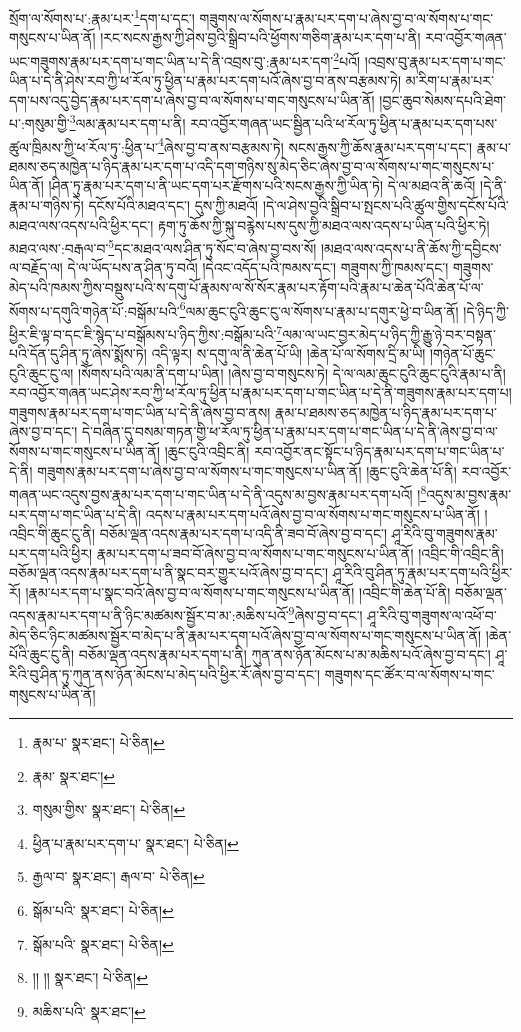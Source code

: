 སྲོག་ལ་སོགས་པ་:རྣམ་པར་\footnote{རྣམ་པ་  སྣར་ཐང་།  པེ་ཅིན། }དག་པ་དང་། གཟུགས་ལ་སོགས་པ་རྣམ་པར་དག་པ་ཞེས་བྱ་བ་ལ་སོགས་པ་གང་གསུངས་པ་ཡིན་ནོ། །རང་སངས་རྒྱས་ཀྱི་ཤེས་བྱའི་སྒྲིབ་པའི་ཕྱོགས་གཅིག་རྣམ་པར་དག་པ་ནི། རབ་འབྱོར་གཞན་ཡང་གཟུགས་རྣམ་པར་དག་པ་གང་ཡིན་པ་དེ་ནི་འབྲས་བུ་:རྣམ་པར་དག་\footnote{རྣམ་  སྣར་ཐང་། }པའོ། །འབྲས་བུ་རྣམ་པར་དག་པ་གང་ཡིན་པ་དེ་ནི་ཤེས་རབ་ཀྱི་ཕ་རོལ་ཏུ་ཕྱིན་པ་རྣམ་པར་དག་པའོ་ཞེས་བྱ་བ་ནས་བརྩམས་ཏེ། མ་རིག་པ་རྣམ་པར་དག་པས་འདུ་བྱེད་རྣམ་པར་དག་པ་ཞེས་བྱ་བ་ལ་སོགས་པ་གང་གསུངས་པ་ཡིན་ནོ། །བྱང་ཆུབ་སེམས་དཔའི་ཐེག་པ་:གསུམ་གྱི་\footnote{གསུམ་གྱིས་  སྣར་ཐང་།  པེ་ཅིན། }ལམ་རྣམ་པར་དག་པ་ནི། རབ་འབྱོར་གཞན་ཡང་སྦྱིན་པའི་ཕ་རོལ་ཏུ་ཕྱིན་པ་རྣམ་པར་དག་པས་ཚུལ་ཁྲིམས་ཀྱི་ཕ་རོལ་ཏུ་:ཕྱིན་པ་\footnote{ཕྱིན་པ་རྣམ་པར་དག་པ་  སྣར་ཐང་།  པེ་ཅིན། }ཞེས་བྱ་བ་ནས་བརྩམས་ཏེ། སངས་རྒྱས་ཀྱི་ཆོས་རྣམ་པར་དག་པ་དང་། རྣམ་པ་ཐམས་ཅད་མཁྱེན་པ་ཉིད་རྣམ་པར་དག་པ་འདི་དག་གཉིས་སུ་མེད་ཅིང་ཞེས་བྱ་བ་ལ་སོགས་པ་གང་གསུངས་པ་ཡིན་ནོ། །ཤིན་ཏུ་རྣམ་པར་དག་པ་ནི་ཡང་དག་པར་རྫོགས་པའི་སངས་རྒྱས་ཀྱི་ཡིན་ཏེ། དེ་ལ་མཐའ་ནི་ཆའོ། །དེ་ནི་རྣམ་པ་གཉིས་ཏེ། དངོས་པོའི་མཐའ་དང་། དུས་ཀྱི་མཐའོ། །དེ་ལ་ཤེས་བྱའི་སྒྲིབ་པ་སྤངས་པའི་ཚུལ་གྱིས་དངོས་པོའི་མཐའ་ལས་འདས་པའི་ཕྱིར་དང་། རྟག་ཏུ་ཆོས་ཀྱི་སྐུ་བརྙེས་པས་དུས་ཀྱི་མཐའ་ལས་འདས་པ་ཡིན་པའི་ཕྱིར་ཏེ། མཐའ་ལས་:བརྒལ་བ་\footnote{རྒྱལ་བ་  སྣར་ཐང་། རྒལ་བ་  པེ་ཅིན། }དང་མཐའ་ལས་ཤིན་ཏུ་སོང་བ་ཞེས་བྱ་བས་སོ། །མཐའ་ལས་འདས་པ་ནི་ཆོས་ཀྱི་དབྱིངས་ལ་བརྗོད་ལ། དེ་ལ་ཡོད་པས་ན་ཤིན་ཏུ་བའོ། །དེའང་འདོད་པའི་ཁམས་དང་། གཟུགས་ཀྱི་ཁམས་དང་། གཟུགས་མེད་པའི་ཁམས་ཀྱིས་བསྡུས་པའི་ས་དགུ་པོ་རྣམས་ལ་སོ་སོར་རྣམ་པར་རྟོག་པའི་རྣམ་པ་ཆེན་པོའི་ཆེན་པོ་ལ་སོགས་པ་དགུའི་གཉེན་པོ་:བསྒོམ་པའི་\footnote{སྒོམ་པའི་  སྣར་ཐང་།  པེ་ཅིན། }ལམ་ཆུང་ངུའི་ཆུང་ངུ་ལ་སོགས་པ་རྣམ་པ་དགུར་ཕྱེ་བ་ཡིན་ནོ། །དེ་ཉིད་ཀྱི་ཕྱིར་ཇི་ལྟ་བ་དང་ཇི་སྙེད་པ་བསྒོམས་པ་ཉིད་ཀྱིས་:བསྒོམ་པའི་\footnote{སྒོམ་པའི་  སྣར་ཐང་།  པེ་ཅིན། }ལམ་ལ་ཡང་བྱར་མེད་པ་ཉིད་ཀྱི་རྒྱུ་ཉེ་བར་བསྟན་པའི་དོན་དུ་ཤིན་ཏུ་ཞེས་སྨོས་ཏེ། འདི་ལྟར། ས་དགུ་ལ་ནི་ཆེན་པོ་ཡི། །ཆེན་པོ་ལ་སོགས་དྲི་མ་ཡི། །གཉེན་པོ་ཆུང་ངུའི་ཆུང་ངུ་ལ། །སོགས་པའི་ལམ་ནི་དག་པ་ཡིན། །ཞེས་བྱ་བ་གསུངས་ཏེ། དེ་ལ་ལམ་ཆུང་ངུའི་ཆུང་ངུའི་རྣམ་པ་ནི། རབ་འབྱོར་གཞན་ཡང་ཤེས་རབ་ཀྱི་ཕ་རོལ་ཏུ་ཕྱིན་པ་རྣམ་པར་དག་པ་གང་ཡིན་པ་དེ་ནི་གཟུགས་རྣམ་པར་དག་པ། གཟུགས་རྣམ་པར་དག་པ་གང་ཡིན་པ་དེ་ནི་ཞེས་བྱ་བ་ནས། རྣམ་པ་ཐམས་ཅད་མཁྱེན་པ་ཉིད་རྣམ་པར་དག་པ་ཞེས་བྱ་བ་དང་། དེ་བཞིན་དུ་བསམ་གཏན་གྱི་ཕ་རོལ་ཏུ་ཕྱིན་པ་རྣམ་པར་དག་པ་གང་ཡིན་པ་དེ་ནི་ཞེས་བྱ་བ་ལ་སོགས་པ་གང་གསུངས་པ་ཡིན་ནོ། །ཆུང་ངུའི་འབྲིང་ནི། རབ་འབྱོར་ནང་སྟོང་པ་ཉིད་རྣམ་པར་དག་པ་གང་ཡིན་པ་དེ་ནི། གཟུགས་རྣམ་པར་དག་པ་ཞེས་བྱ་བ་ལ་སོགས་པ་གང་གསུངས་པ་ཡིན་ནོ། །ཆུང་ངུའི་ཆེན་པོ་ནི། རབ་འབྱོར་གཞན་ཡང་འདུས་བྱས་རྣམ་པར་དག་པ་གང་ཡིན་པ་དེ་ནི་འདུས་མ་བྱས་རྣམ་པར་དག་པའོ། །\footnote{།། །།  སྣར་ཐང་།  པེ་ཅིན། }འདུས་མ་བྱས་རྣམ་པར་དག་པ་གང་ཡིན་པ་དེ་ནི། འདས་པ་རྣམ་པར་དག་པའོ་ཞེས་བྱ་བ་ལ་སོགས་པ་གང་གསུངས་པ་ཡིན་ནོ། །འབྲིང་གི་ཆུང་ངུ་ནི། བཅོམ་ལྡན་འདས་རྣམ་པར་དག་པ་འདི་ནི་ཟབ་བོ་ཞེས་བྱ་བ་དང་། ཤཱ་རིའི་བུ་གཟུགས་རྣམ་པར་དག་པའི་ཕྱིར། རྣམ་པར་དག་པ་ཟབ་བོ་ཞེས་བྱ་བ་ལ་སོགས་པ་གང་གསུངས་པ་ཡིན་ནོ། །འབྲིང་གི་འབྲིང་ནི། བཅོམ་ལྡན་འདས་རྣམ་པར་དག་པ་ནི་སྣང་བར་གྱུར་པའོ་ཞེས་བྱ་བ་དང་། ཤཱ་རིའི་བུ་ཤིན་ཏུ་རྣམ་པར་དག་པའི་ཕྱིར་རོ། །རྣམ་པར་དག་པ་སྣང་བའོ་ཞེས་བྱ་བ་ལ་སོགས་པ་གང་གསུངས་པ་ཡིན་ནོ། །འབྲིང་གི་ཆེན་པོ་ནི། བཅོམ་ལྡན་འདས་རྣམ་པར་དག་པ་ནི་ཉིང་མཚམས་སྦྱོར་བ་མ་:མཆིས་པའོ་\footnote{མཆིས་པའི་  སྣར་ཐང་། }ཞེས་བྱ་བ་དང་། ཤཱ་རིའི་བུ་གཟུགས་ལ་འཕོ་བ་མེད་ཅིང་ཉིང་མཚམས་སྦྱོར་བ་མེད་པ་ནི་རྣམ་པར་དག་པའོ་ཞེས་བྱ་བ་ལ་སོགས་པ་གང་གསུངས་པ་ཡིན་ནོ། །ཆེན་པོའི་ཆུང་ངུ་ནི། བཅོམ་ལྡན་འདས་རྣམ་པར་དག་པ་ནི། ཀུན་ནས་ཉོན་མོངས་པ་མ་མཆིས་པའོ་ཞེས་བྱ་བ་དང་། ཤཱ་རིའི་བུ་ཤིན་ཏུ་ཀུན་ནས་ཉོན་མོངས་པ་མེད་པའི་ཕྱིར་རོ་ཞེས་བྱ་བ་དང་། གཟུགས་དང་ཚོར་བ་ལ་སོགས་པ་གང་གསུངས་པ་ཡིན་ནོ། 